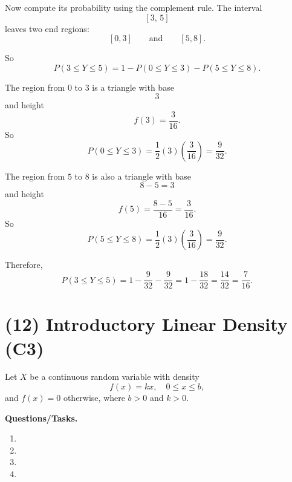 Now compute its probability using the complement rule. The interval
\[
[3,\,5]
\]
leaves two end regions:
\[
[0,3]
\qquad \text{and} \qquad
[5,8].
\]

So
\[
P(3\le Y\le 5)=1-P(0\le Y\le 3)-P(5\le Y\le 8).
\]

The region from $0$ to $3$ is a triangle with base
\[
3
\]
and height
\[
f(3)=\frac{3}{16}.
\]
So
\[
P(0\le Y\le 3)=\frac12(3)\left(\frac{3}{16}\right)=\frac{9}{32}.
\]

The region from $5$ to $8$ is also a triangle with base
\[
8-5=3
\]
and height
\[
f(5)=\frac{8-5}{16}=\frac{3}{16}.
\]
So
\[
P(5\le Y\le 8)=\frac12(3)\left(\frac{3}{16}\right)=\frac{9}{32}.
\]

Therefore,
\[
P(3\le Y\le 5)=1-\frac{9}{32}-\frac{9}{32}
=1-\frac{18}{32}
=\frac{14}{32}
=\frac{7}{16}.
\]


\section{(12) Introductory Linear Density (C3)}
\label{sec:introductory-linear-density-c3}

Let $X$ be a continuous random variable with density
\[
f(x)=kx,\quad 0\le x\le b,
\]
and $f(x)=0$ otherwise, where $b>0$ and $k>0$.

\textbf{Questions/Tasks.}
\begin{enumerate}[label=(\alph*)]
	\item {}
	\item {}
	\item {}
	\item {}
\end{enumerate}


